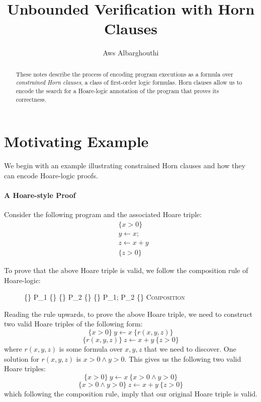 \documentclass{amsart}
\theoremstyle{definition}
\theoremstyle{remark}
\numberwithin{equation}{section}
\begin{document}
\title{Unbounded Verification with Horn Clauses}

\author{Aws Albarghouthi}
\address{University of Wisconsin--Madison}

\maketitle

\begin{abstract}
These notes describe the process
of encoding program executions as a formula
over \emph{constrained Horn clauses},
a class of first-order logic formulas.
Horn clauses allow us to encode the search
for a Hoare-logic annotation of the program
that proves its correctness.
\end{abstract}

\section{Motivating Example}
We begin with an example illustrating constrained Horn
clauses and how they can encode Hoare-logic proofs.

\paragraph{A Hoare-style Proof}
Consider the following program and the associated
Hoare triple:
\begin{align*}
& \{x > 0\}\\
& y \gets x;\\
&z \gets x + y\\
& \{z > 0\}
\end{align*}

To prove that the above Hoare triple is valid,
we follow the composition rule of Hoare-logic:

\begin{figure}[h]
  \centering
  \prooftree
       \{\phi\} P_1 \{\psi\} \quad\quad
       \{\psi\} P_2 \{\chi\}
  \justifies
  \{\phi\} P_1; P_2 \{\chi\}
  \using \textsc{Composition}
  \endprooftree
\end{figure}

Reading the rule upwards,
to prove the above Hoare triple,
we need to construct two valid Hoare triples
of the following form:
$$\{x> 0\} ~ y \gets x ~ \{r(x,y,z)\}$$
$$\{r(x,y,z)\} ~ z \gets x + y ~ \{z > 0\}$$
where $r(x,y,z)$ is some formula over $x,y,z$
that we need to discover.
One solution for
$r(x,y,z)$ is $x > 0 \land y > 0$.
This gives us the following two valid Hoare triples:
$$\{x> 0\} ~ y \gets x ~ \{x > 0 \land y > 0 \}$$
$$\{x > 0 \land y > 0\} ~ z \gets x + y ~ \{z > 0\}$$
which following the composition rule,
imply that our original Hoare triple is valid.
\end{document}
